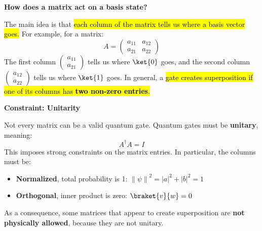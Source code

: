 \begin{flushleft}
    \textcolor{Green3}{ \textbf{How does a matrix act on a basis state?}}
\end{flushleft}
The main idea is that \hl{each column of the matrix tells us where a basis vector goes.} For example, for a matrix:
\begin{equation*}
    A =
    \begin{pmatrix}
        a_{11} & a_{12} \\
        a_{21} & a_{22}
    \end{pmatrix}
\end{equation*}
The first column $\begin{pmatrix}
    a_{11} \\ a_{21}
\end{pmatrix}$ tells us where $\ket{0}$ goes, and the second column $\begin{pmatrix}
    a_{12} \\ a_{22}
\end{pmatrix}$ tells us where $\ket{1}$ goes. In general, a \hl{gate creates superposition if one of its columns has \textbf{two non-zero entries}.} 

\highspace
\begin{flushleft}
    \textcolor{Red2}{ \textbf{Constraint: Unitarity}}
\end{flushleft}
Not every matrix can be a valid quantum gate. Quantum gates must be \textbf{unitary}, meaning:
\begin{equation*}
    A^\dagger A = I
\end{equation*}
This imposes strong constraints on the matrix entries. In particular, the columns must be:
\begin{itemize}
    \item \textbf{Normalized}, total probability is 1: $\left\| \psi \right\|^{2} = \left|a\right|^{2} + \left|b\right|^{2} = 1$
    \item \textbf{Orthogonal}, inner product is zero: $\braket{v}{w} = 0$
\end{itemize}
As a consequence, some matrices that appear to create superposition are \textbf{not physically allowed}, because they are not unitary.

